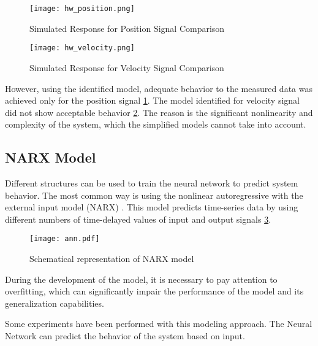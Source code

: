 \begin{figure}[h!]
    \centering
    \texttt{[image: hw\_position.png]}
    \caption{Simulated Response for Position Signal Comparison}
    \label{fig:hw_position}
\end{figure}

\begin{figure}[h!]
    \centering
    \texttt{[image: hw\_velocity.png]}
    \caption{Simulated Response for Velocity Signal Comparison}
    \label{fig:hw_velocity}
\end{figure}

However, using the identified model, adequate behavior to the measured data
was achieved only for the position signal \ref{fig:hw_position}. The model identified
for velocity signal did not show acceptable behavior \ref{fig:hw_velocity}.  The
reason is the significant nonlinearity and complexity of the system, which
the simplified models cannot take into account.



\newpage
\subsection{NARX Model}

Different structures can be used to train the neural network to predict
system behavior. The most common way is using the nonlinear autoregressive
with the external input model (NARX) \cite{ident}. This model predicts time-series data
by using different numbers of time-delayed values of input and output
signals \ref{fig:ann}.

\begin{figure}[h!]
    \centering
    \texttt{[image: ann.pdf]}
    \caption{Schematical representation of NARX model}
    \label{fig:ann}
\end{figure}


During the development of the model, it is necessary to pay attention to
overfitting, which can significantly impair the performance of the model
and its generalization capabilities.

Some experiments have been performed with this modeling approach. The
Neural Network can predict the behavior of the system based on input.
